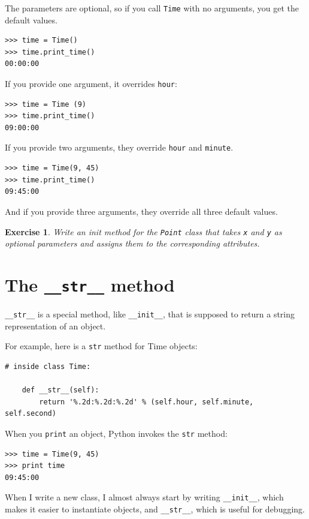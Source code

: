 \documentclass[12pt,a4paper,final,twoside,onecolumn,titlepage]{book}
\newtheorem{exercise}{Exercise}[chapter]
\begin{document}
The parameters are optional, so if you call {\tt Time} with
no arguments, you get the default values.

\begin{verbatim}
>>> time = Time()
>>> time.print_time()
00:00:00
\end{verbatim}
%
If you provide one argument, it overrides {\tt hour}:

\begin{verbatim}
>>> time = Time (9)
>>> time.print_time()
09:00:00
\end{verbatim}
%
If you provide two arguments, they override {\tt hour} and
{\tt minute}.

\begin{verbatim}
>>> time = Time(9, 45)
>>> time.print_time()
09:45:00
\end{verbatim}
%
And if you provide three arguments, they override all three
default values.


\begin{exercise}

Write an init method for the {\tt Point} class that takes
{\tt x} and {\tt y} as optional parameters and assigns
them to the corresponding attributes.
\end{exercise}


\section{The {\tt \_\_str\_\_} method}

\verb"__str__" is a special method, like \verb"__init__",
that is supposed to return a string representation of an object.

For example, here is a {\tt str} method for Time objects:

\begin{verbatim}
# inside class Time:

    def __str__(self):
        return '%.2d:%.2d:%.2d' % (self.hour, self.minute, self.second)
\end{verbatim}
%
When you {\tt print} an object, Python invokes the {\tt str} method:

\begin{verbatim}
>>> time = Time(9, 45)
>>> print time
09:45:00
\end{verbatim}
%
When I write a new class, I almost always start by writing 
\verb"__init__", which makes it easier to instantiate objects, and 
\verb"__str__", which is useful for debugging.
\end{document}
